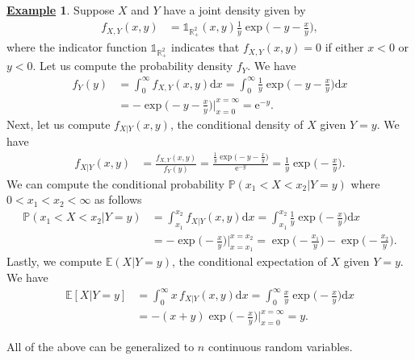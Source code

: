 \documentclass[12pt]{book}
\numberwithin{equation}{chapter}
\theoremstyle{plain}
\numberwithin{theorem}{section}
\theoremstyle{definition}
\newtheorem{example}[theorem]{\underline{Example}}
\numberwithin{exercise}{chapter}
\newcommand{\<}{\langle}
\renewcommand{\>}{\rangle}
\renewcommand{\(}{\left(}
\renewcommand{\)}{\right)}
\renewcommand{\[}{\left[}
\renewcommand{\]}{\right]}
\newcommand\Eb{\mathds{E}}
\newcommand\Pb{\mathds{P}}
\newcommand\Rb{\mathds{R}}
\newcommand\Ib{\mathds{1}}
\newcommand\dd{\mathrm{d}}
\newcommand\ee{\mathrm{e}}
\theoremstyle{definition}
\numberwithin{question}{section}
\begin{document}
\begin{example}
Suppose $X$ and $Y$ have a joint density given by
\begin{align}
f_{X,Y}(x,y)
	&=	\Ib_{\Rb_+^2}(x,y) \frac{1}{y} \exp \Big( - y - \frac{x}{y} \Big) , 
\end{align}
where the indicator function $\Ib_{\Rb_+^2}$ indicates that $f_{X,Y}(x,y) = 0$ if either $x<0$ or $y<0$.
Let us compute the probability density $f_Y$.  We have
\begin{align}
f_Y(y)
	&=	\int_0^\infty f_{X,Y}(x,y) \dd x 
	=	\int_0^\infty \frac{1}{y} \exp \Big( - y - \frac{x}{y} \Big) \dd x \\
	&=	-\exp \Big( - y - \frac{x}{y} \Big) \Big|_{x=0}^{x = \infty} 
	=	\ee^{-y} .
\end{align}
Next, let us compute $f_{X|Y}(x,y)$, the conditional density of $X$ given $Y = y$.  We have 
\begin{align}
f_{X|Y}(x,y)
	&=	\frac{ f_{X,Y}(x,y) }{f_Y(y)}
	=		\frac{\frac{1}{y} \exp \Big( - y - \frac{x}{y} \Big)}{\ee^{-y}}
	=		\frac{1}{y} \exp \Big( - \frac{x}{y} \Big) .
\end{align}
We can compute the conditional probability $\Pb( x_1 < X < x_2 | Y = y )$ where $0 < x_1 < x_2 < \infty$ as follows
\begin{align}
\Pb( x_1 < X < x_2 | Y = y )
	&=	\int_{x_1}^{x_2} f_{X|Y}(x,y) \dd x
	=		\int_{x_1}^{x_2} \frac{1}{y} \exp \Big( - \frac{x}{y} \Big)  \dd x \\
	&=	- \exp \Big( - \frac{x}{y} \Big)  \Big|_{x = x_1}^{x = x_2} 
	=		\exp \Big( - \frac{x_1}{y} \Big) - \exp \Big( - \frac{x_2}{y} \Big) .
\end{align}
Lastly, we compute  $\Eb( X | Y = y )$, the conditional expectation of $X$ given $Y=y$.  We have
\begin{align}
\Eb[ X | Y = y ]
	&=	\int_0^\infty x \, f_{X|Y}(x,y) \dd x
	=		\int_0^\infty \frac{x}{y} \exp \Big( - \frac{x}{y} \Big) \dd x \\
	&=	-( x + y ) \exp \Big( - \frac{x}{y} \Big) \Big|_{x=0}^{x = \infty} 
	=		y .
\end{align}
\end{example}

\noindent
All of the above can be generalized to $n$ continuous random variables.

\end{document}
